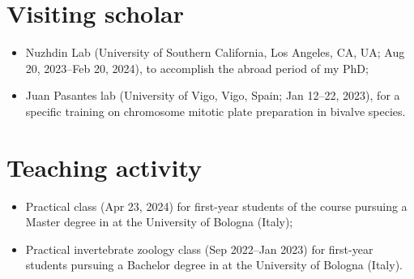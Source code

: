 \section*{Visiting scholar}
\begin{itemize}
    \item Nuzhdin Lab (University of Southern California, Los Angeles, CA, UA; Aug 20, 2023--Feb 20, 2024), to accomplish the abroad period of my PhD;
    \item Juan Pasantes\curlyapostrophe{} lab (University of Vigo, Vigo, Spain; Jan 12--22, 2023), for a specific training on chromosome mitotic plate preparation in bivalve species.
\end{itemize}

\section*{Teaching activity}
\begin{itemize}
    \item Practical class  (Apr 23, 2024) for first-year students of the course  pursuing a Master degree in  at the University of Bologna (Italy);
    \item Practical invertebrate zoology class (Sep 2022--Jan 2023) for first-year students pursuing a Bachelor degree in  at the University of Bologna (Italy).
\end{itemize}

